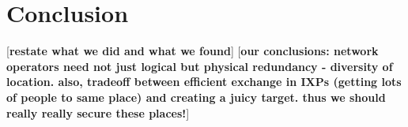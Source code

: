 \documentclass{sig-alternate-10pt}
\newcommand{\tbd}[1]{[{\bf{#1}}]}
\begin{document}
    \section{Conclusion}
        \tbd{restate what we did and what we found}
    \tbd{our conclusions: network operators need not just logical but
    physical redundancy - diversity of location. also, tradeoff between
    efficient exchange in IXPs (getting lots of people to same place) and
    creating a juicy target. thus we should really really secure these
    places!}



%
\end{document}

